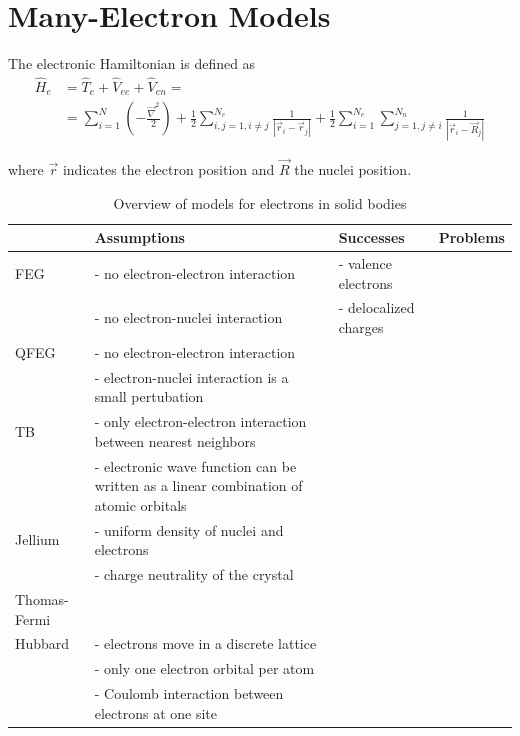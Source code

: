 \documentclass{article}
\newcommand{\lr}[1]{\left(#1\right)}
\begin{document}
\newpage


\section{Many-Electron Models}
The electronic Hamiltonian is defined as
	\begin{align}
		\hat{H}_e &= \hat{T}_e + \hat{V}_{ee} + \hat{V}_{en} = \\
		&= \sum_{i=1}^N \lr{ -\frac{\vec{\nabla}^2}{2} } + \frac{1}{2} \sum_{i,j=1, i\neq j}^{N_e} \frac{1}{|\vec{r}_i - \vec{r}_j|} + \frac{1}{2} \sum_{i=1}^{N_e}\sum_{j=1,j\neq i}^{N_n} \frac{1}{|\vec{r}_i - \vec{R}_j|}
	\end{align}

where $\vec{r}$ indicates the electron position and $\vec{R}$ the nuclei position.

\begin{table}[H]
	\centering
	\caption{Overview of models for electrons in solid bodies}
	\begin{tabularx}{\textwidth}{l|X|X|X}
		\hline\hline
			& Assumptions & Successes & Problems \\
		\hline
			FEG & - no electron-electron interaction & - valence electrons &  \\
			& - no electron-nuclei interaction & - delocalized charges &  \\
		\hline
			QFEG & - no electron-electron interaction &  &  \\
			& - electron-nuclei interaction is a small pertubation &  &  \\
		\hline
			TB & - only electron-electron interaction between nearest neighbors &  &  \\
			& - electronic wave function can be written as a linear combination of atomic orbitals &   &   \\
		\hline
			Jellium & - uniform density of nuclei and electrons &  &  \\
			& - charge neutrality of the crystal &  &  \\
		\hline
			Thomas-Fermi &  &  &  \\
		\hline
			Hubbard & - electrons move in a discrete lattice &  &  \\
			& - only one electron orbital per atom &  &  \\
			& - Coulomb interaction between electrons at one site &  &  \\		
		\hline\hline
	\end{tabularx}
\end{table}
\end{document}

